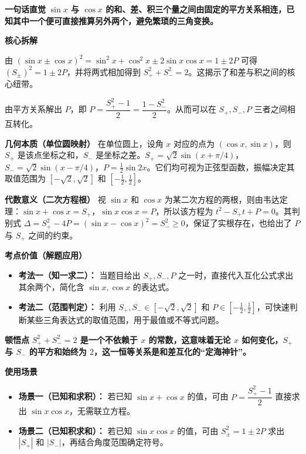 \begin{explanationbox}
	\textbf{\textcolor{CExplanation}{一句话直觉}}
	\textbf{$\sin x$ 与 $\cos x$ 的和、差、积三个量之间由固定的平方关系相连，已知其中一个便可直接推算另外两个，避免繁琐的三角变换。}

	\medskip
	\textbf{\textcolor{CExplanation}{核心拆解}}
	\begin{description}[style=nextline, leftmargin=2.8em, labelsep=0.5em, itemsep=0.45em]
		\item[\textbf{要点一（平方关联）：}]
			由 $(\sin x\pm\cos x)^2 = \sin^2 x+\cos^2 x \pm 2\sin x\cos x = 1\pm 2P$ 可得 $(S_{\pm})^2 = 1\pm 2P$，并将两式相加得到 $S_+^2+S_-^2 = 2$。这揭示了和差与积之间的核心纽带。
		\item[\textbf{要点二（互化枢纽）：}]
			由平方关系解出 $P$，即 $P = \dfrac{S_+^2-1}{2} = \dfrac{1-S_-^2}{2}$。从而可以在 $S_+,S_-,P$ 三者之间相互转化。
	\end{description}

	\medskip
	\textbf{\textcolor{CExplanation}{几何本质（单位圆映射）}}
	在单位圆上，设角 $x$ 对应的点为 $(\cos x,\sin x)$，则 $S_+$ 是该点坐标之和，$S_-$ 是坐标之差。$S_+ = \sqrt2\sin(x+\pi/4)$，$S_- = \sqrt2\sin(x-\pi/4)$，$P = \frac12\sin2x$。它们均可视为正弦型函数，振幅决定其取值范围为 $[-\sqrt2,\sqrt2]$ 和 $[-\frac12,\frac12]$。

	\medskip
	\textbf{\textcolor{CExplanation}{代数意义（二次方程根）}}
	视 $\sin x$ 和 $\cos x$ 为某二次方程的两根，则由韦达定理：$\sin x+\cos x = S_+$，$\sin x\cos x = P$，所以该方程为 $t^2 - S_+ t + P = 0$。其判别式 $\Delta = S_+^2-4P = (\sin x-\cos x)^2 = S_-^2 \ge 0$，保证了实根存在，也给出了 $P$ 与 $S_+$ 之间的约束。

	\medskip
	\textbf{\textcolor{CExplanation}{考点价值（解题应用）}}
	\begin{itemize}[leftmargin=*, itemsep=0.5em, topsep=0.4em]
		\item \textbf{考法一（知一求二）：} 当题目给出 $S_+,S_-,P$ 之一时，直接代入互化公式求出其余两个，简化含 $\sin x,\cos x$ 的表达式。
		\item \textbf{考法二（范围判定）：} 利用 $S_+,S_-\in[-\sqrt2,\sqrt2]$ 和 $P\in[-\frac12,\frac12]$，可快速判断某些三角表达式的取值范围，用于最值或不等式问题。
	\end{itemize}

	\medskip
	\textbf{\textcolor{CExplanation}{顿悟点}}
	\textbf{$S_+^2+S_-^2 = 2$ 是一个不依赖于 $x$ 的常数，这意味着无论 $x$ 如何变化，$S_+$ 与 $S_-$ 的平方和始终为 $2$，这一恒等关系是和差互化的“定海神针”。}

	\medskip
	\textbf{\textcolor{CExplanation}{使用场景}}
	\begin{itemize}[leftmargin=*, itemsep=0.5em, topsep=0.4em]
		\item \textbf{场景一（已知和求积）：} 若已知 $\sin x+\cos x$ 的值，可由 $P = \dfrac{S_+^2-1}{2}$ 直接求出 $\sin x\cos x$，无需联立方程。
		\item \textbf{场景二（已知积求和）：} 若已知 $\sin x\cos x$ 的值，可由 $S_{\pm}^2 = 1\pm 2P$ 求出 $|S_+|$ 和 $|S_-|$，再结合角度范围确定符号。
	\end{itemize}

\end{explanationbox}
